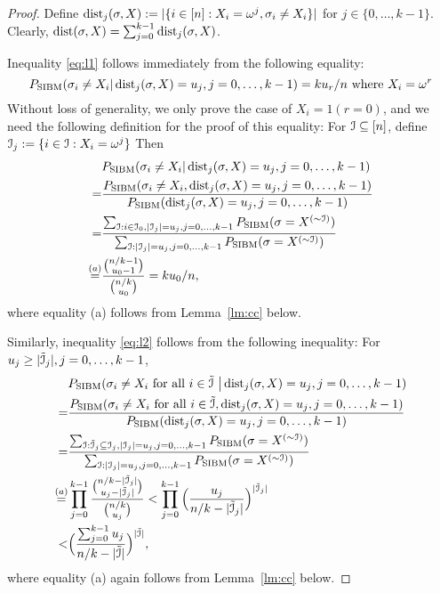 \documentclass{article}
\begin{document}
\begin{proof}
Define $\operatorname{dist}_j(\sigma,X):=|\{i\in[n]:X_i=\omega^j, \sigma_i \neq X_i\}|$ for $j \in \{0, \dots, k-1\}$. Clearly, $\operatorname{dist}(\sigma,X)=\sum_{j=0}^{k-1} \operatorname{dist}_j(\sigma,X)$.

Inequality \eqref{eq:l1} follows immediately from the following equality:
$$
P_{\operatorname{SIBM}}(\sigma_i \neq X_i |
\operatorname{dist}_j(\sigma,X)=u_j,
j=0,\dots,k-1) 
= k u_r / n \textrm{ where } X_i = \omega^r
$$
Without loss of generality,
we only prove the case of $X_i=1 (r=0)$, and
we need the following definition for the proof of this equality:
For $\mathcal{I}\subseteq[n]$, define $\mathcal{I}_j:=\{i\in\mathcal{I}:X_i=\omega^j\}$ Then
\begin{align*}
& P_{\operatorname{SIBM}}(\sigma_i \neq X_i |
\operatorname{dist}_j(\sigma, X) = u_j,j=0,\dots, k-1)  \\
= & \frac{P_{\operatorname{SIBM}}(\sigma_i \neq X_i ,
\operatorname{dist}_j(\sigma, X) = u_j,j=0,\dots, k-1)}
{P_{\operatorname{SIBM}}(
\operatorname{dist}_j(\sigma, X) = u_j,j=0,\dots, k-1)} \\
= & \frac{\sum_{\mathcal{I}:i\in\mathcal{I}_0,|\mathcal{I}_j|=u_j,j=0,\dots,k-1}P_{\operatorname{SIBM}}(\sigma=X^{(\sim\mathcal{I})}) }
{\sum_{\mathcal{I}: |\mathcal{I}_j|=u_j,j=0,\dots,k-1}P_{\operatorname{SIBM}}(\sigma=X^{(\sim\mathcal{I})}) } \\
\overset{(a)}{=} & \frac{\binom{n/k-1}{u_0 -1}}
{\binom{n/k}{u_0} }
= ku_0/n ,
\end{align*}
where equality (a) follows from Lemma~\ref{lm:cc} below.

Similarly, inequality \eqref{eq:l2} follows from the following inequality:
For $u_j\geq |\tilde{\mathcal{I}}_j|, j=0, \dots, k-1$,
\begin{align*}
& P_{\operatorname{SIBM}}(\sigma_i \neq X_i \text{~for all~}  i\in\tilde{\mathcal{I}} ~ \big|
\operatorname{dist}_j(\sigma, X) = u_j,j=0,\dots, k-1)  \\
= & \frac{P_{\operatorname{SIBM}}(\sigma_i \neq X_i \text{~for all~}  i\in\tilde{\mathcal{I}} ,
\operatorname{dist}_j(\sigma, X) = u_j,j=0,\dots, k-1)}{P_{\operatorname{SIBM}}(
\operatorname{dist}_j(\sigma, X) = u_j,j=0,\dots, k-1)} \\
= & \frac{\sum_{\mathcal{I}:\tilde{\mathcal{I}}_j\subseteq\mathcal{I}_j,
|\mathcal{I}_j|=u_j,j=0,\dots,k-1}P_{\operatorname{SIBM}}(\sigma=X^{(\sim\mathcal{I})}) }
{\sum_{\mathcal{I}:|\mathcal{I}_j|=u_j,j=0,\dots,k-1}P_{\operatorname{SIBM}}(\sigma=X^{(\sim\mathcal{I})}) }  \\
\overset{(a)}{=} & \prod_{j=0}^{k-1} \frac{\binom{n/k-|\tilde{\mathcal{I}}_j|}{u_j -|\tilde{\mathcal{I}}_j|} }
{\binom{n/k}{u_j} }
< \prod_{j=0}^{k-1}\Big(\frac{u_j}{n/k- |\tilde{\mathcal{I}}_j|} \Big)^{|\tilde{\mathcal{I}}_j|}
\\
< & \Big(\frac{\sum_{j=0}^{k-1} u_j}{n/k- |\tilde{\mathcal{I}}|} \Big)^{|\tilde{\mathcal{I}}|}  ,
\end{align*}
where equality (a) again follows from Lemma~\ref{lm:cc} below.
\end{proof}
\end{document}
